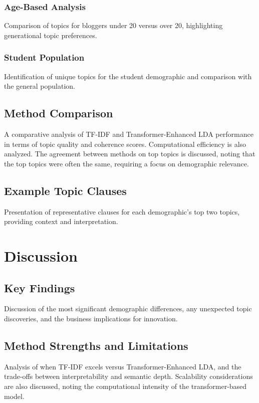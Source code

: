 \documentclass[conference]{IEEEtran}
\begin{document}
\subsubsection{Age-Based Analysis}
Comparison of topics for bloggers under 20 versus over 20, highlighting generational topic preferences.

\subsubsection{Student Population}
Identification of unique topics for the student demographic and comparison with the general population.

\subsection{Method Comparison}
A comparative analysis of TF-IDF and Transformer-Enhanced LDA performance in terms of topic quality and coherence scores. Computational efficiency is also analyzed. The agreement between methods on top topics is discussed, noting that the top topics were often the same, requiring a focus on demographic relevance.

\subsection{Example Topic Clauses}
Presentation of representative clauses for each demographic's top two topics, providing context and interpretation.

\section{Discussion}
\subsection{Key Findings}
Discussion of the most significant demographic differences, any unexpected topic discoveries, and the business implications for innovation.

\subsection{Method Strengths and Limitations}
Analysis of when TF-IDF excels versus Transformer-Enhanced LDA, and the trade-offs between interpretability and semantic depth. Scalability considerations are also discussed, noting the computational intensity of the transformer-based model.
\end{document}
